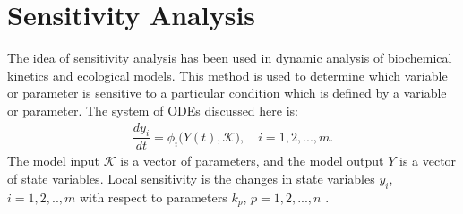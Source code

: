 \documentclass[a4paper,12pt]{article}
\begin{document}
\section{Sensitivity Analysis}
\noindent The idea of sensitivity analysis has been used in dynamic analysis of biochemical kinetics and ecological  models. This method is used to determine which variable or parameter is sensitive to a particular condition which is defined by a variable or parameter. The system of ODEs discussed here is: 
\begin{equation}  
\begin{array}{llll}
\dfrac{dy_{i}}{dt}=\phi_{i}\big(Y(t), \mathcal{K} \big), \quad i=1, 2, ..., m.
\end{array}\label{SA}  
\end{equation}
\noindent The model input $\mathcal{K}$ is a vector of parameters, and the model output $Y$ is a vector of state variables. Local sensitivity is the changes in state variables $y_{i}$, $i=1,2,..,m$ with respect to parameters $k_{p}$, $p=1,2,...,n$ . \\ 
             
\end{document}
